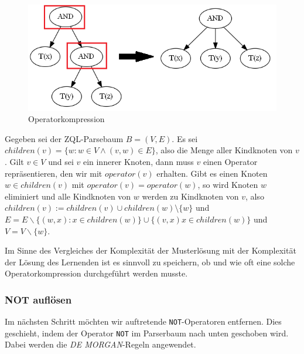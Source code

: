 \begin{figure}[H]
\centering
\includegraphics[scale=0.4]{Bilder/op_comp.png}
\caption{Operatorkompression}
\label{fig:opcomp}
\end{figure}

Gegeben sei der ZQL-Parsebaum $B=(V,E)$. Es sei $children(v) = \{ w : w\in V \wedge (v,w)\in E\}$, also die Menge aller Kindknoten von $v$. Gilt $v\in V$ und sei $v$ ein innerer Knoten, dann muss $v$ einen Operator repräsentieren, den wir mit $\mathit{operator}(v)$ erhalten. Gibt es einen Knoten $w\in children(v)$ mit $\mathit{operator}(v)=\mathit{operator}(w)$, so wird Knoten $w$ eliminiert und alle Kindknoten von $w$ werden zu Kindknoten von $v$, also $children(v) := children(v) \cup children(w) \setminus \{w\}$ und $E=E\backslash \{ (w,x) : x\in children(w)\} \cup \{(v,x) x\in children(w)\}$ und $V=V\backslash \{w\}$.

Im Sinne des Vergleiches der Komplexität der Musterlösung mit der Komplexität der Lösung des Lernenden ist es sinnvoll zu speichern, ob und wie oft eine solche Operatorkompression durchgeführt werden musste.

\subsubsection{NOT auflösen}

Im nächsten Schritt möchten wir auftretende \verb|NOT|-Operatoren entfernen. Dies geschieht, indem der Operator \verb|NOT| im Parserbaum nach unten geschoben wird. Dabei werden die \textit{DE MORGAN}-Regeln angewendet. 

